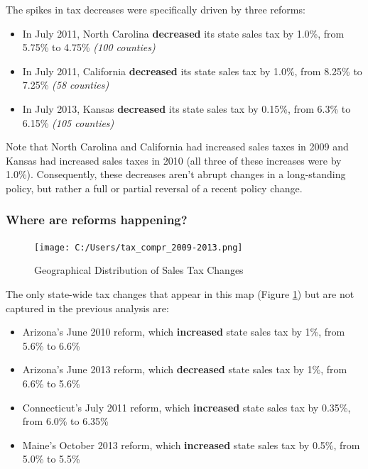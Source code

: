\documentclass[]{article}
\providecommand{\tightlist}{%
  \setlength{\itemsep}{0pt}\setlength{\parskip}{0pt}}
\begin{document}
The spikes in tax decreases were specifically driven by three reforms:

\begin{itemize}
\tightlist
\item
  In July 2011, North Carolina \textbf{decreased} its state sales tax by
  1.0\%, from 5.75\% to 4.75\% \emph{(100 counties)}
\item
  In July 2011, California \textbf{decreased} its state sales tax by
  1.0\%, from 8.25\% to 7.25\% \emph{(58 counties)}
\item
  In July 2013, Kansas \textbf{decreased} its state sales tax by 0.15\%,
  from 6.3\% to 6.15\% \emph{(105 counties)}
\end{itemize}

Note that North Carolina and California had increased sales taxes in
2009 and Kansas had increased sales taxes in 2010 (all three of these
increases were by 1.0\%). Consequently, these decreases aren't abrupt
changes in a long-standing policy, but rather a full or partial reversal
of a recent policy change.

\subsubsection{Where are reforms
happening?}\label{where-are-reforms-happening}

\begin{figure}
\centering
\texttt{[image: C:/Users/tax\_compr\_2009-2013.png]}
\caption{\label{fig:map}Geographical Distribution of Sales Tax Changes}
\end{figure}

The only state-wide tax changes that appear in this map (Figure
\ref{fig:map}) but are not captured in the previous analysis are:

\begin{itemize}
\tightlist
\item
  Arizona's June 2010 reform, which \textbf{increased} state sales tax
  by 1\%, from 5.6\% to 6.6\%
\item
  Arizona's June 2013 reform, which \textbf{decreased} state sales tax
  by 1\%, from 6.6\% to 5.6\%
\item
  Connecticut's July 2011 reform, which \textbf{increased} state sales
  tax by 0.35\%, from 6.0\% to 6.35\%
\item
  Maine's October 2013 reform, which \textbf{increased} state sales tax
  by 0.5\%, from 5.0\% to 5.5\%
\end{itemize}
\end{document}
